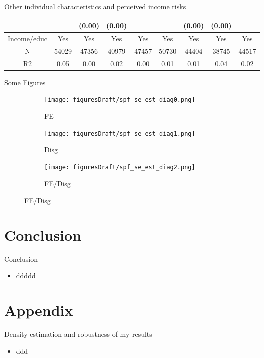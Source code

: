 \documentclass{beamer}
\begin{document}
\begin{frame}{Other individual characteristics and perceived income risks}
\begin{table}
{\begin{tabular}{ccccccccc}
				&          &    (0.00) &     (0.00) &             &           &     (0.00) &      (0.00) &              \\
				\hline 
				Income/educ          & Yes   & Yes   & Yes   & Yes  & Yes  & Yes  & Yes & Yes   \\
				N            &    54029 &     47356 &      40979 &       47457 &     50730 &      44404 &       38745 &        44517  \\
				R2           &     0.05 &      0.00 &       0.02 &        0.00 &      0.01 &       0.01 &        0.04 &         0.02 \\
				\hline 
			\end{tabular}
		}
	\end{table}
\end{frame}


\begin{frame}{Some Figures}
	\begin{figure}[ht]
		\label{figurelabel}
		\begin{subfigure}[b]{0.2\textwidth}
			\centering
			\caption{FE}
			\texttt{[image: figuresDraft/spf\_se\_est\_diag0.png]}
		\end{subfigure}
		\hfill
		\begin{subfigure}[b]{0.2\textwidth}
			\caption{Disg}
			\texttt{[image: figuresDraft/spf\_se\_est\_diag1.png]}
		\end{subfigure}
		\hfill
		\begin{subfigure}[b]{0.2\textwidth}
			\caption{FE/Disg}
			\texttt{[image: figuresDraft/spf\_se\_est\_diag2.png]}
		\end{subfigure}
	\end{figure}
\end{frame}




\section{Conclusion}

\begin{frame}{Conclusion}
	\begin{itemize}
		\item ddddd
	\end{itemize}	
\end{frame}

\section*{Appendix}

\begin{frame}{Density estimation and robustness of my results}
	\begin{itemize}
		\item ddd
	\end{itemize}
\end{frame}




\end{document}
